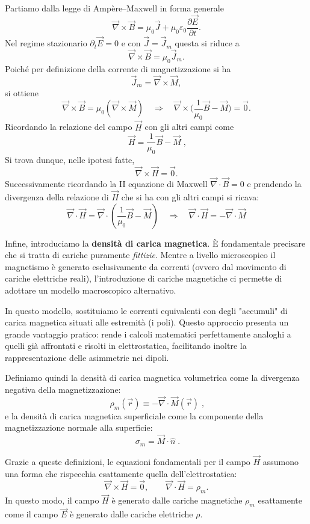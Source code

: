 \documentclass{book}
\begin{document}
Partiamo dalla legge di Ampère--Maxwell in forma generale
\[
\vec{\nabla}\times\vec{B} = \mu_0\vec{J} + \mu_0\varepsilon_0\frac{\partial\vec{E}}{\partial t}.
\]
Nel regime stazionario \(\partial_t\vec{E}=0\) e con \(\vec{J}=\vec{J}_m\) questa si riduce a
\[
\vec{\nabla}\times\vec{B} = \mu_0\vec{J}_m.
\]
Poiché per definizione della corrente di magnetizzazione si ha
\[
\vec{J}_m=\vec{\nabla}\times\vec{M},
\]
si ottiene
\[
\vec{\nabla}\times\vec{B} = \mu_0(\vec{\nabla}\times\vec{M}) \quad\Longrightarrow\quad
\vec{\nabla}\times\biggl(\frac{1}{\mu_0}\vec{B}-\vec{M}\biggr)=\vec{0}.
\]
Ricordando la relazione del campo \(\vec{H}\) con gli altri campi come
\[
\;\vec{H}=\frac{1}{\mu_0}\vec{B}-\vec{M}\;,
\]
Si trova dunque, nelle ipotesi fatte,
\[ 
\vec{\nabla}\times\vec{H}=\vec{0}.
\]
Successivamente ricordando  la II equazione di Maxwell \(\vec{\nabla}\cdot\vec{B}=0\) e prendendo la divergenza della relazione di \(\vec{H}\) che si ha con gli altri campi si ricava:
$$ \vec{\nabla}\cdot\vec{H} = \vec{\nabla}\cdot \left( \frac{1}{\mu_0}\vec{B}-\vec{M} \right)
\quad
\Longrightarrow\quad
\vec{\nabla}\cdot\vec{H} = -\vec{\nabla}\cdot\vec{M} $$

Infine, introduciamo la \textbf{densità di carica magnetica}.
È fondamentale precisare che si tratta di cariche puramente \emph{fittizie}. Mentre a livello microscopico il magnetismo è generato esclusivamente da correnti (ovvero dal movimento di cariche elettriche reali), l'introduzione di cariche magnetiche ci permette di adottare un modello macroscopico alternativo.

In questo modello, sostituiamo le correnti equivalenti con degli "accumuli" di carica magnetica situati alle estremità (i poli). Questo approccio presenta un grande vantaggio pratico: rende i calcoli matematici perfettamente analoghi a quelli già affrontati e risolti in elettrostatica, facilitando inoltre la rappresentazione delle asimmetrie nei dipoli.

Definiamo quindi la densità di carica magnetica volumetrica come la divergenza negativa della magnetizzazione:
\[
\boxed{\;\rho_m(\vec{r}) \equiv -\vec{\nabla}\cdot\vec{M}(\vec{r})\;},
\]
e la densità di carica magnetica superficiale come la componente della magnetizzazione normale alla superficie:
\[
\boxed{\;\sigma_m = \vec{M}\cdot\hat{n}\;}.
\]

Grazie a queste definizioni, le equazioni fondamentali per il campo \(\vec{H}\) assumono una forma che rispecchia esattamente quella dell'elettrostatica:
\[
\vec{\nabla}\times\vec{H}=\vec{0},\qquad \vec{\nabla}\cdot\vec{H}=\rho_m.
\]
In questo modo, il campo \(\vec{H}\) è generato dalle cariche magnetiche \(\rho_m\) esattamente come il campo \(\vec{E}\) è generato dalle cariche elettriche \(\rho\).
\end{document}
